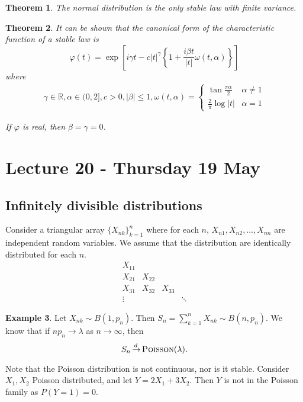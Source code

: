 \documentclass[10pt, oneside, reqno]{amsart}
\theoremstyle{plain}%
\newtheorem{thm}{Theorem}[section]
\theoremstyle{definition}
\newtheorem{exmp}[thm]{Example}
\theoremstyle{remark}
\renewcommand{\phi}{\varphi}
\newcommand{\R}{\mathbb{R}}
\def\cid{\,{\buildrel \!d \over \rightarrow}\,}
\begin{document}
\begin{thm}
    The normal distribution is the only stable law with finite variance.
\end{thm}

\begin{thm}
    It can be shown that the canonical form of the characteristic function of a stable law is \[
        \phi(t) = \exp\left[ i \gamma t - c|t|^\gamma \left\{ 1 + \frac{i \beta t}{|t|} \omega(t, \alpha)\right\}\right]
    \]  where \begin{align*}
        \gamma \in \R, \alpha \in (0, 2], c > 0, |\beta | \leq 1, \omega(t, \alpha) = \begin{cases}
            \tan \frac{\pi \alpha}{2} & \alpha \neq 1 \\
            \frac{2}{\pi} \log |t|  &\alpha = 1
        \end{cases}
    \end{align*}
    
    If $\phi$ is real, then $\beta = \gamma = 0$. 
\end{thm}

\section{Lecture 20 - Thursday 19 May} %
\label{sec:lecture_20_thursday_19_may}
\subsection{Infinitely divisible distributions} %
\label{sub:infinitely_divisible_distributions}

Consider a triangular array $\{ X_{nk} \}_{k=1}^n$ where for each $n$, $X_{n1}, X_{n2}, \dots, X_{nn}$ are independent random variables.  We assume that the distribution are identically distributed for each $n$.\[  \begin{matrix}
    X_{11} &        & \\
    X_{21} & X_{22} &   \\
    X_{31} & X_{32} & X_{33} \\
    \vdots &        &       &\ddots
\end{matrix}
\]

\begin{exmp}
    Let $X_{nk} \sim B(1, p_n)$.  Then $S_n = \sum_{k=1}^n X_{nk} \sim B(n , p_n)$.  We know that if $n p_n \rightarrow \lambda$ as $n \rightarrow \infty$, then \[
        S_n \cid \textsc{Poisson}(\lambda).
    \]
    
    Note that the Poisson distribution is not continuous, nor is it stable.  Consider $X_1, X_2$ Poisson distributed, and let $Y = 2X_1 + 3X_2$.  Then $Y$ is not in the Poisson family as $P(Y = 1) = 0$.  
\end{exmp}
\end{document}
